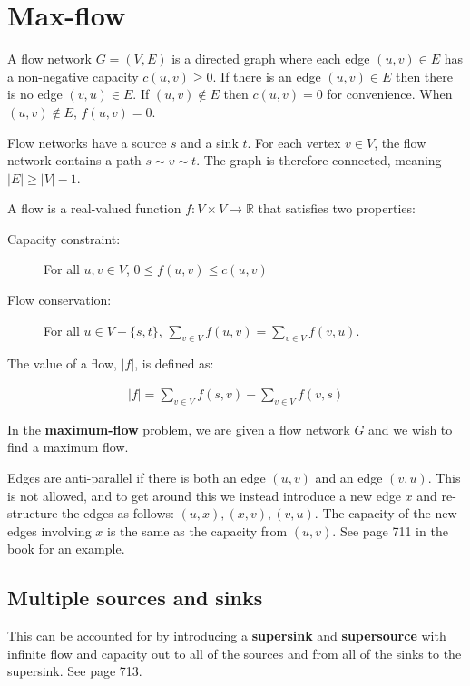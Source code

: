 \section{Max-flow}
A flow network $G = (V,E)$ is a directed graph where each edge $(u,v) \in E$ has
a non-negative capacity $c(u,v) \geq 0$. If there is an edge $(u,v) \in E$ then
there is no edge $(v,u) \in E$. If $(u,v) \notin E$ then $c(u,v) = 0$ for convenience.
When $(u,v) \notin E$, $f(u,v) = 0$.

Flow networks have a source $s$ and a sink $t$. For each vertex $v \in V$, the flow
network contains a path $s \sim v \sim t$. The graph is therefore connected, meaning
$|E| \geq |V| - 1$.

A flow is a real-valued function $f : V \times V \rightarrow \mathbb{R}$ that satisfies
two properties:

\begin{description}
	\item[Capacity constraint:] For all $u,v \in V$, $0 \leq f(u,v) \leq c(u,v)$

	\item[Flow conservation:] For all $u \in V - \{s,t\}$, 
	$\sum_{v \in V} f(u,v) = \sum_{v \in V} f(v,u)$.
\end{description}

The value of a flow, $|f|$, is defined as:

\begin{align*}
	|f| = \sum_{v \in V} f(s,v) - \sum_{v \in V} f(v,s)
\end{align*}

In the \textbf{maximum-flow} problem, we are given a flow network $G$ and we wish to find
a maximum flow.

Edges are anti-parallel if there is both an edge $(u,v)$ and an edge $(v,u)$. This is not allowed,
and to get around this we instead introduce a new edge $x$ and re-structure the edges as follows:
$(u,x), (x,v), (v,u)$. The capacity of the new edges involving $x$ is the same as the capacity from
$(u,v)$. See page 711 in the book for an example.

\subsection{Multiple sources and sinks}
This can be accounted for by introducing a \textbf{supersink} and \textbf{supersource} with infinite
flow and capacity out to all of the sources and from all of the sinks to the supersink. See page 713.